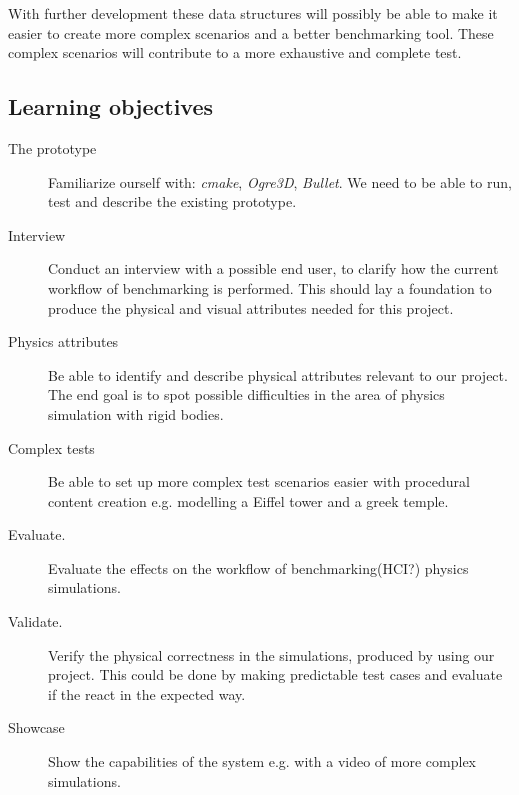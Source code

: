 \documentclass[a4paper, 10pt]{article}
\begin{document}
With further development these data structures will possibly be able to make it easier to create more complex scenarios
and a better benchmarking tool. These complex scenarios will contribute to a more exhaustive and complete test.
\subsection*{Learning objectives}
\begin{description}
\item[The prototype] 	Familiarize ourself with: \emph{cmake}, \emph{Ogre3D}, \emph{Bullet}. 
			We need to be able to run, test and describe the existing prototype.
\item[Interview] Conduct an interview with a possible end user, to clarify how the current workflow of benchmarking is performed.
		 This should lay a foundation to produce the physical and visual attributes needed for this project. 
\item[Physics attributes]Be able to identify and describe physical attributes relevant to our project. The end goal is to spot possible difficulties in the
			area of physics simulation with rigid bodies.
\item[Complex tests] Be able to set up more complex test scenarios easier with procedural content creation e.g. modelling a Eiffel tower and a
			greek temple.
\item[Evaluate.] Evaluate the effects on the workflow of benchmarking(HCI?) physics simulations.
\item[Validate.] Verify the physical correctness in the simulations, produced by using our project. 
		This could be done by making predictable test cases and evaluate if the react in the expected way. 
\item[Showcase] Show the capabilities of the system e.g. with a video of more complex simulations.
\end{description}
\end{document}
